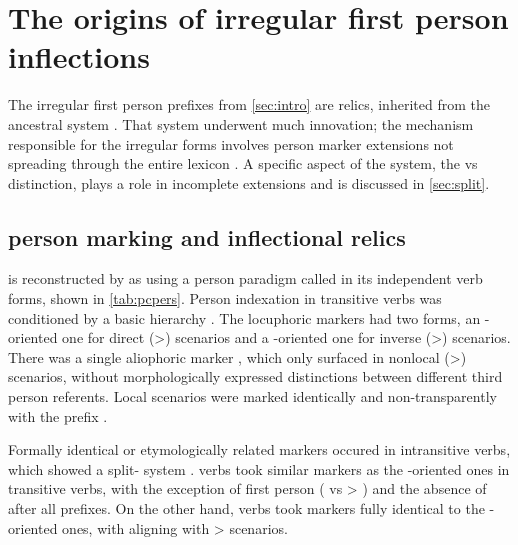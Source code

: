\section{The origins of irregular first person inflections}
\label{sec:background}
The irregular first person prefixes from \cref{sec:intro} are relics, inherited from the ancestral \PC system .
That system underwent much innovation; the mechanism responsible for the irregular forms involves person marker extensions not spreading through the entire  lexicon .
A specific aspect of the system, the  vs  distinction, plays a role in incomplete extensions and is discussed in \cref{sec:split}.

\subsection{\PC person marking and inflectional relics}
\label{sec:pc_person}
\PC is reconstructed by \textcite{gildea1998} as using a person paradigm called \setone in its independent verb forms, shown in \cref{tab:pcpers}.
Person indexation in transitive verbs was conditioned by a basic hierarchy .
The locuphoric markers had two forms, an -oriented one for direct (>) scenarios and a -oriented one for inverse (>) scenarios.
There was a single aliophoric marker , which only surfaced in nonlocal (>) scenarios, without morphologically expressed distinctions between different third person referents.
Local scenarios were marked identically and non-transparently with the  prefix .



Formally identical or etymologically related markers occured in intransitive verbs, which showed a split- system .
 verbs took similar markers as the -oriented ones in transitive verbs, with the exception of first person (  vs > ) and the absence of  after all  prefixes.
On the other hand,  verbs took markers fully identical to the -oriented ones, with   aligning with > scenarios.

